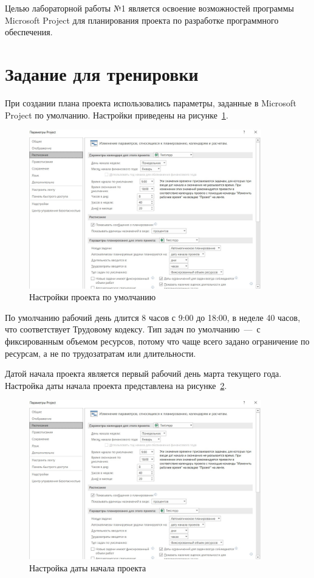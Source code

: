 \setcounter{page}{2}
Целью лабораторной работы №1 является освоение возможностей программы Microsoft 
Project для планирования проекта по разработке программного обеспечения. 

\section{Задание для тренировки}

При создании плана проекта использовались параметры, заданные в Microsoft Project по умолчанию.
Настройки приведены на рисунке~\ref{fig:test_params}.

\begin{figure}[H]
	\centering
	\includegraphics[width=0.9\textwidth]{img/test/params.jpg}
	\caption{Настройки проекта по умолчанию}
	\label{fig:test_params}
\end{figure}

По умолчанию рабочий день длится 8 часов с 9:00 до 18:00, в неделе 40 часов, что соответствует Трудовому кодексу.
Тип задач по умолчанию~---~с фиксированным объемом ресурсов, потому что чаще всего задано ограничение по ресурсам, а не по трудозатратам или длительности.

Датой начала проекта является первый рабочий день марта текущего года.
Настройка даты начала проекта представлена на рисунке~\ref{fig:proj_start}.

\begin{figure}[H]
	\centering
	\includegraphics[width=0.9\textwidth]{img/test/params.jpg}
	\caption{Настройка даты начала проекта}
	\label{fig:proj_start}
\end{figure}

